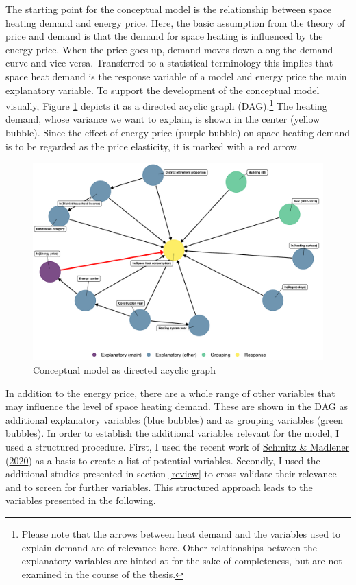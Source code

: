 \documentclass[12pt,twoside]{reedthesis}
\begin{document}
The starting point for the conceptual model is the relationship between space heating demand and energy price. Here, the basic assumption from the theory of price and demand is that the demand for space heating is influenced by the energy price. When the price goes up, demand moves down along the demand curve and vice versa. Transferred to a statistical terminology this implies that space heat demand is the response variable of a model and energy price the main explanatory variable. To support the development of the conceptual model visually, Figure \ref{fig:dag} depicts it as a directed acyclic graph (DAG).\footnote{Please note that the arrows between heat demand and the variables used to explain demand are of relevance here. Other relationships between the explanatory variables are hinted at for the sake of completeness, but are not examined in the course of the thesis.} The heating demand, whose variance we want to explain, is shown in the center (yellow bubble). Since the effect of energy price (purple bubble) on space heating demand is to be regarded as the price elasticity, it is marked with a red arrow.
\begin{figure}

{\centering \includegraphics[width=1\linewidth]{figure/conceptual_dag_red} 

}

\caption[Conceptual model as directed acyclic graph]{Conceptual model as directed acyclic graph}\label{fig:dag}
\end{figure}
In addition to the energy price, there are a whole range of other variables that may influence the level of space heating demand. These are shown in the DAG as additional explanatory variables (blue bubbles) and as grouping variables (green bubbles). In order to establish the additional variables relevant for the model, I used a structured procedure. First, I used the recent work of \protect\hyperlink{ref-schmitz_madlener20}{Schmitz \& Madlener} (\protect\hyperlink{ref-schmitz_madlener20}{2020}) as a basis to create a list of potential variables. Secondly, I used the additional studies presented in section \ref{review} to cross-validate their relevance and to screen for further variables. This structured approach leads to the variables presented in the following.
\end{document}
